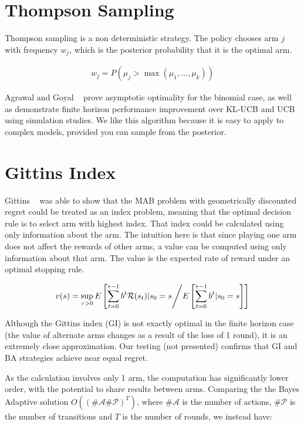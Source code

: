 \documentclass[11pt,a4,singlespacing,titlepagenumber=on]{scrreprt}
\numberwithin{equation}{chapter} %
\theoremstyle{remark}
\begin{document}
\section{ Thompson Sampling }

Thompson sampling is a non deterministic strategy. The policy chooses arm $j$ with frequency $w_j$, which is the posterior probability that it is the optimal arm.

\begin{align}
w_j = P(\mu_j > \max(\mu_1, ..., \mu_k))
\end{align}

Agrawal and Goyal ~\cite{DBLP:journals/corr/abs-1111-1797} prove asymptotic optimality for the binomial case, as well as demonstrate finite horizon performance improvement over KL-UCB and UCB using simulation studies. We like this algorithm because it is easy to apply to complex models, provided you can sample from the posterior.

\section{ Gittins Index }

Gittins ~\cite{gittins1979bandit} was able to show that the MAB problem with geometrically discounted regret could be treated as an index problem, meaning that the optimal decision rule is to select arm with highest index. That index could be calculated using only information about the arm. The intuition here is that since playing one arm does not affect the rewards of other arms, a value can be computed using only information about that arm. The value is the expected rate of reward under an optimal stopping rule.

\begin{align}
v(s) = \sup_{\tau > 0} E\left[ \sum_{t=0}^{\tau-1} b^t \mathcal{R}(s_t) | s_0 = s  \middle/  E\left[ \sum_{t=0}^{\tau-1} b^t | s_0 = s \right]  \right]
\end{align}

Although the Gittins index (GI) is not exactly optimal in the finite horizon case (the value of alternate arms changes as a result of the loss of 1 round), it is an extremely close approximation. Our testing (not presented) confirms that GI and BA strategies achieve near equal regret.

As the calculation involves only 1 arm, the computation has significantly lower order, with the potential to share results between arms. Comparing the the Bayes Adaptive solution $O((\#\mathcal{A} \#\mathcal{P})^T)$, where $\#\mathcal{A}$ is the number of actions, $\#\mathcal{P}$ is the number of transitions and $T$ is the number of rounds, we instead have:
\end{document}

